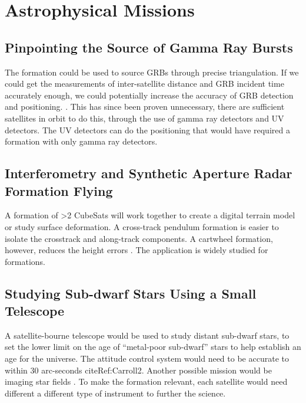 \section{Astrophysical Missions}

\subsection{Pinpointing the Source of Gamma Ray Bursts}

The formation could be used to source GRBs through precise triangulation. If we could get the measurements of inter-satellite distance and GRB incident time accurately enough, we could potentially increase the accuracy of GRB detection and positioning. \cite{Ref:Dill}. This has since been proven unnecessary, there are sufficient satellites in orbit to do this, through the use of gamma ray detectors and UV detectors. The UV detectors can do the positioning that would have required a formation with only gamma ray detectors. 

\subsection{Interferometry and Synthetic Aperture Radar Formation Flying}

A formation of >2 CubeSats will work together to create a digital
terrain model or study surface deformation. A cross-track pendulum
formation is easier to isolate the crosstrack and along-track components. A cartwheel formation, however, reduces the height errors \cite{Ref:Peterson}. The application is widely studied for formations. 

\subsection{Studying Sub-dwarf Stars Using a Small Telescope}

A satellite-bourne telescope would be used to study distant sub-dwarf stars, to set the lower limit on the age of ``metal-poor sub-dwarf'' stars to help establish an age for the universe. The attitude control system would need to be accurate to within 30 arc-seconds cite{Ref:Carroll2}. Another possible mission would be imaging star fields \cite{Ref:Nicholas}. To make the formation relevant, each satellite would need different a different type of instrument to further the science. 

